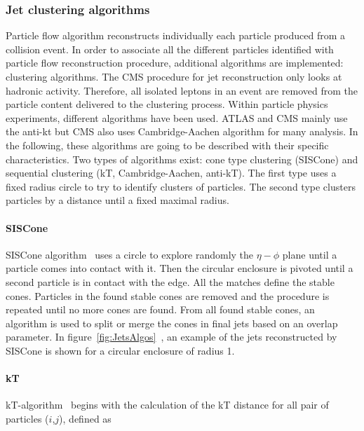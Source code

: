 \subsubsection{Jet clustering algorithms}

Particle flow algorithm reconstructs individually each particle produced from a collision event. In order to associate all the different particles identified with particle flow reconstruction procedure, additional algorithms are implemented: clustering algorithms. The CMS procedure for jet reconstruction only looks at hadronic activity. Therefore, all isolated leptons in an event are removed from the particle content delivered to the clustering process. Within particle physics experiments, different algorithms have been used. ATLAS and CMS mainly use the anti-kt but CMS also uses Cambridge-Aachen algorithm for many analysis. In the following, these algorithms are going to be described with their specific characteristics. Two types of algorithms exist: cone type clustering (SISCone) and sequential clustering (kT, Cambridge-Aachen, anti-kT). The first type uses a fixed radius circle to try to identify clusters of particles. The second type clusters particles by a distance until a fixed maximal radius. 

\paragraph{SISCone}

SISCone algorithm~\cite{Salam:2007xv} uses a circle to explore randomly the $\eta-\phi$ plane until a particle comes into contact with it. Then the circular enclosure is pivoted until a second particle is in contact with the edge. All the matches define the stable cones. Particles in the found stable cones are removed and the procedure is repeated until no more cones are found. From all found stable cones, an algorithm is used to split or merge the cones in final jets based on an overlap parameter. In figure~\ref{fig:JetsAlgos}~\cite{Cacciari:2008gp}, an example of the jets reconstructed by SISCone is shown for a circular enclosure of radius 1. 

\paragraph{kT}

kT-algorithm~\cite{Ellis:1993tq} begins with the calculation of the kT distance for all pair of particles ($i$,$j$), defined as

